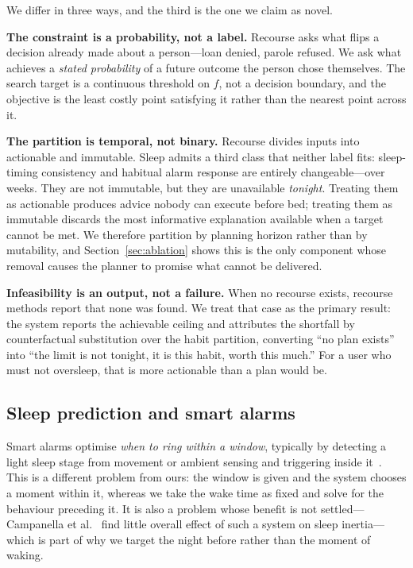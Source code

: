 \documentclass[conference]{IEEEtran}
\begin{document}
We differ in three ways, and the third is the one we claim as novel.

\textbf{The constraint is a probability, not a label.} Recourse asks what flips
a decision already made about a person---loan denied, parole refused. We ask
what achieves a \emph{stated probability} of a future outcome the person chose
themselves. The search target is a continuous threshold on $f$, not a decision
boundary, and the objective is the least costly point satisfying it rather than
the nearest point across it.

\textbf{The partition is temporal, not binary.} Recourse divides inputs into
actionable and immutable. Sleep admits a third class that neither label fits:
sleep-timing consistency and habitual alarm response are entirely
changeable---over weeks. They are not immutable, but they are unavailable
\emph{tonight}. Treating them as actionable produces advice nobody can execute
before bed; treating them as immutable discards the most informative explanation
available when a target cannot be met. We therefore partition by planning
horizon rather than by mutability, and Section~\ref{sec:ablation} shows this is
the only component whose removal causes the planner to promise what cannot be
delivered.

\textbf{Infeasibility is an output, not a failure.} When no recourse exists,
recourse methods report that none was found. We treat that case as the primary
result: the system reports the achievable ceiling and attributes the shortfall
by counterfactual substitution over the habit partition, converting ``no plan
exists'' into ``the limit is not tonight, it is this habit, worth this much.''
For a user who must not oversleep, that is more actionable than a plan would be.

\subsection{Sleep prediction and smart alarms}

Smart alarms optimise \emph{when to ring within a window}, typically by
detecting a light sleep stage from movement or ambient sensing and triggering
inside it~\cite{smartalarm}. This is a different problem from ours: the window
is given and the system chooses a moment within it, whereas we take the wake
time as fixed and solve for the behaviour preceding it. It is also a problem
whose benefit is not settled---Campanella et al.~\cite{smartalarm} find little
overall effect of such a system on sleep inertia---which is part of why we
target the night before rather than the moment of waking.
\end{document}
